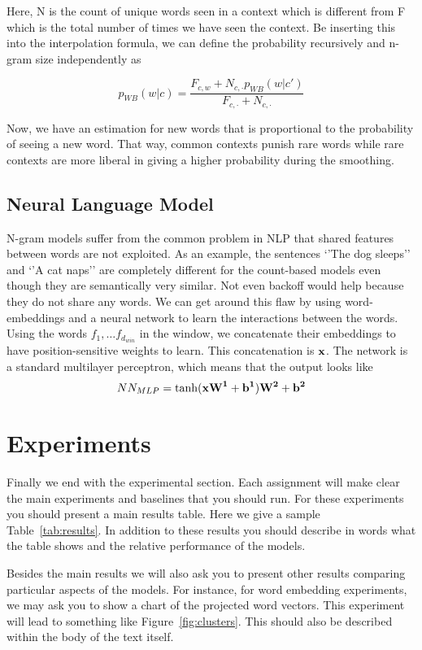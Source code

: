 \documentclass[11pt]{article}
\begin{document}
Here, N is the count of unique words seen in a context which is different from F which is the total number of times we have seen the context. 
Be inserting this into the interpolation formula, we can define the probability recursively and n-gram size independently as

$$p_{WB}(w|c)=\frac{F_{c,w} + N_{c, \cdot}p_{WB}(w|c')}{F_{c,\cdot}+N_{c,\cdot}}$$

Now, we have an estimation for new words that is proportional to the probability of seeing a new word. That way, common contexts punish rare words while rare contexts are more liberal in giving a higher probability during the smoothing.

\subsection{Neural Language Model}

N-gram models suffer from the common problem in NLP that shared features between words are not exploited. As an example, the sentences `'The dog sleeps'' and `'A cat naps'' are completely different for the count-based models even though they are semantically very similar. Not even backoff would help because they do not share any words. 
We can get around this flaw by using word-embeddings and a neural network to learn the interactions between the words. 
Using the words $f_1, \ldots f_{d_{win}}$ in the window, we concatenate their embeddings to have position-sensitive weights to learn. This concatenation is $\bf{x}$. 
The network is a standard multilayer perceptron, which means that the output looks like 
$$ NN_{MLP}=\tanh(\bf{xW}^1+\bf{b}^1)\bf{W}^2+\bf{b}^2$$







\section{Experiments}

Finally we end with the experimental section. Each assignment will make clear the main experiments and baselines that you should run. For these experiments you should present a main results table. Here we give a sample Table~\ref{tab:results}. In addition to these results you should describe in words what the table shows and the relative performance of the models.

Besides the main results we will also ask you to present other results
comparing particular aspects of the models. For instance, for word
embedding experiments, we may ask you to show a chart of the projected
word vectors. This experiment will lead to something like
Figure~\ref{fig:clusters}. This should also be described within the
body of the text itself.
\end{document}
